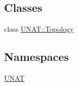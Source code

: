 \subsection*{Classes}
\begin{DoxyCompactItemize}
\item 
class \mbox{\hyperlink{classUNAT_1_1Topology}{U\+N\+A\+T\+::\+Topology}}
\end{DoxyCompactItemize}
\subsection*{Namespaces}
\begin{DoxyCompactItemize}
\item 
 \mbox{\hyperlink{namespaceUNAT}{U\+N\+AT}}
\end{DoxyCompactItemize}
